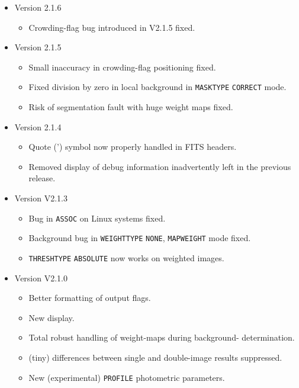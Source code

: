 \documentclass[twoside,11pt]{article}
\renewcommand{\_}{\texttt{\symbol{95}}}
\begin{document}
 \begin{itemize}
   \item Version 2.1.6
     \begin{itemize}
        \item Crowding-flag bug introduced in V2.1.5 fixed.
     \end{itemize}
   \item Version 2.1.5
      \begin{itemize}
        \item Small inaccuracy in crowding-flag positioning fixed.
        \item Fixed division by zero in local background in 
              \texttt{MASK\_TYPE} \texttt{CORRECT} mode.
        \item Risk of segmentation fault with huge weight maps fixed.
      \end{itemize}
   \item Version 2.1.4
      \begin{itemize}
        \item Quote (') symbol now properly handled in FITS headers.
        \item Removed display of debug information inadvertently left
              in the previous release.
      \end{itemize}
   \item Version V2.1.3
      \begin{itemize}
        \item Bug in \texttt{ASSOC} on Linux systems fixed.
        \item Background bug in \texttt{WEIGHT\_TYPE} \texttt{NONE}, 
              \texttt{MAP\_WEIGHT} mode fixed.
        \item \texttt{THRESH\_TYPE} \texttt{ABSOLUTE} now works on
              weighted images. 
      \end{itemize}
   \item Version V2.1.0
      \begin{itemize}
        \item Better formatting of output flags.
        \item  New display.
        \item Total robust handling of weight-maps during background-
              determination.
        \item (tiny) differences between single and double-image results
              suppressed.
        \item New (experimental) \texttt{\_PROFILE} photometric parameters.

\end{itemize}
\end{itemize}
\end{document}
